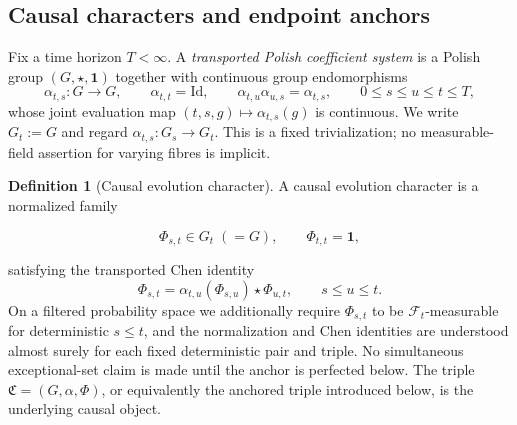 \documentclass[10pt,reqno]{amsart}
\theoremstyle{plain}
\theoremstyle{definition}
\newtheorem{definition}[theorem]{Definition}
\theoremstyle{remark}
\begin{document}
\subsection{Causal characters and endpoint anchors}

Fix a time horizon \(T<\infty\).  A \emph{transported Polish coefficient
system} is a Polish group \((G,\star,{\mathbf 1})\) together with continuous group
endomorphisms
\begin{equation}
 \alpha_{t,s}:G\longrightarrow G,
 \qquad
 \alpha_{t,t}={\mathrm{Id}},
 \qquad
 \alpha_{t,u}\alpha_{u,s}=\alpha_{t,s},
 \qquad 0\le s\le u\le t\le T,
 \label{cc:eq-transport-system}
\end{equation}
whose joint evaluation map \((t,s,g)\mapsto\alpha_{t,s}(g)\) is continuous.
We write \(G_t:=G\) and regard \(\alpha_{t,s}:G_s\to G_t\).  This is a fixed
trivialization; no measurable-field assertion for varying fibres is implicit.

\begin{definition}[Causal evolution character]
\label{cc:def-causal-character}
A causal evolution character is a normalized family

\[
 \Phi_{s,t}\in G_t\;(=G),
 \qquad \Phi_{t,t}={\mathbf 1},
\]

satisfying the transported Chen identity
\begin{equation}
 \Phi_{s,t}
 =\alpha_{t,u}(\Phi_{s,u})\star\Phi_{u,t},
 \qquad s\le u\le t.
 \label{cc:eq-transported-Chen}
\end{equation}
On a filtered probability space we additionally require
\(\Phi_{s,t}\) to be \({\mathcal F}_t\)-measurable for deterministic \(s\le t\),
and the normalization and Chen identities are understood almost surely for
each fixed deterministic pair and triple.  No simultaneous exceptional-set
claim is made until the anchor is perfected below.
The triple \(\mathfrak C=(G,\alpha,\Phi)\), or equivalently the anchored
triple introduced below, is the underlying causal object.
\end{definition}
\end{document}
